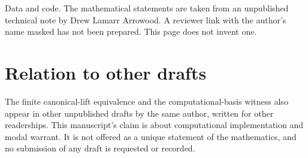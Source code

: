 \documentclass[11pt]{article}
\begin{document}
Data and code. The mathematical statements are taken from an unpublished technical note by Drew Lamarr Arrowood. A reviewer link with the author's name masked has not been prepared. This page does not invent one.

\section*{Relation to other drafts}
The finite canonical-lift equivalence and the computational-basis witness also appear in other unpublished drafts by the same author, written for other readerships. This manuscript's claim is about computational implementation and modal warrant. It is not offered as a unique statement of the mathematics, and no submission of any draft is requested or recorded.
\end{document}
